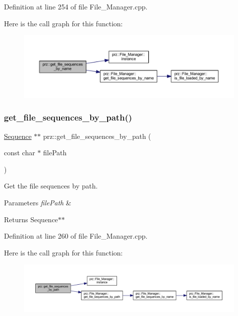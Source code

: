 Definition at line 254 of file File\+\_\+\+Manager.\+cpp.

Here is the call graph for this function\+:
\nopagebreak
\begin{figure}[H]
\begin{center}
\leavevmode
\includegraphics[width=350pt]{namespaceprz_a1bf460cd725d36d217e1a94ea659038e_cgraph}
\end{center}
\end{figure}
\mbox{\label{namespaceprz_ad20f7c7ee778799b88580eaf987b20d3}} 
\subsubsection{\texorpdfstring{get\_file\_sequences\_by\_path()}{get\_file\_sequences\_by\_path()}}
{\footnotesize\ttfamily \mbox{\hyperlink{classprz_1_1_sequence}{Sequence}} $\ast$$\ast$ prz\+::get\+\_\+file\+\_\+sequences\+\_\+by\+\_\+path (\begin{DoxyParamCaption}\item[{const char $\ast$}]{file\+Path }\end{DoxyParamCaption})}



Get the file sequences by path. 


\begin{DoxyParams}{Parameters}
{\em file\+Path} & \\
\hline
\end{DoxyParams}
\begin{DoxyReturn}{Returns}
Sequence$\ast$$\ast$ 
\end{DoxyReturn}


Definition at line 260 of file File\+\_\+\+Manager.\+cpp.

Here is the call graph for this function\+:
\nopagebreak
\begin{figure}[H]
\begin{center}
\leavevmode
\includegraphics[width=350pt]{namespaceprz_ad20f7c7ee778799b88580eaf987b20d3_cgraph}
\end{center}
\end{figure}
\mbox{\label{namespaceprz_ada727f31dec00b46eaf85d040dc0641c}} 
